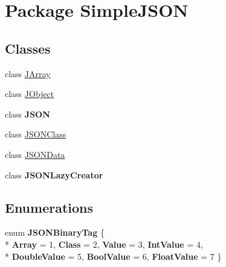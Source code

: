 \hypertarget{namespace_simple_j_s_o_n}{\section{Package Simple\+J\+S\+O\+N}
\label{namespace_simple_j_s_o_n}
}
\subsection*{Classes}
\begin{DoxyCompactItemize}
\item 
class \hyperlink{class_simple_j_s_o_n_1_1_j_array}{J\+Array}
\item 
class \hyperlink{class_simple_j_s_o_n_1_1_j_object}{J\+Object}
\item 
class {\bfseries J\+S\+O\+N}
\item 
class \hyperlink{class_simple_j_s_o_n_1_1_j_s_o_n_class}{J\+S\+O\+N\+Class}
\item 
class \hyperlink{class_simple_j_s_o_n_1_1_j_s_o_n_data}{J\+S\+O\+N\+Data}
\item 
class {\bfseries J\+S\+O\+N\+Lazy\+Creator}
\end{DoxyCompactItemize}
\subsection*{Enumerations}
\begin{DoxyCompactItemize}
\item 
\hypertarget{namespace_simple_j_s_o_n_ac295d5b1d543de2e0fbcbd6363a27f50}{enum {\bfseries J\+S\+O\+N\+Binary\+Tag} \{ \\*
{\bfseries Array} = 1, 
{\bfseries Class} = 2, 
{\bfseries Value} = 3, 
{\bfseries Int\+Value} = 4, 
\\*
{\bfseries Double\+Value} = 5, 
{\bfseries Bool\+Value} = 6, 
{\bfseries Float\+Value} = 7
 \}}\label{namespace_simple_j_s_o_n_ac295d5b1d543de2e0fbcbd6363a27f50}

\end{DoxyCompactItemize}
